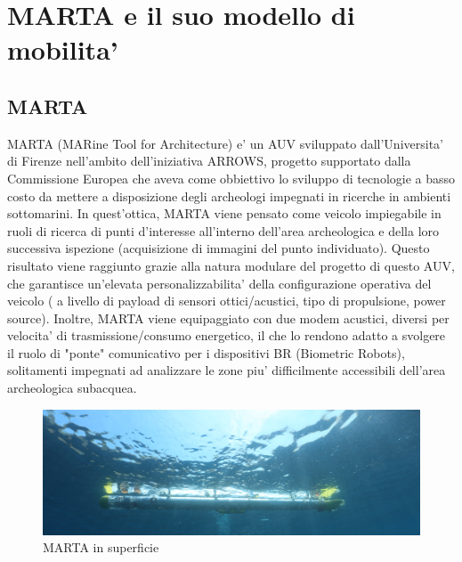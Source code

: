 \chapter{MARTA e il suo modello di mobilita'}

\section{MARTA}

MARTA (MARine Tool for Architecture) e' un AUV sviluppato dall'Universita' di Firenze nell'ambito dell'iniziativa ARROWS, progetto supportato dalla Commissione Europea che aveva come obbiettivo lo sviluppo di tecnologie a basso costo da mettere a disposizione degli archeologi impegnati in ricerche in ambienti sottomarini. In quest'ottica, MARTA viene pensato come veicolo impiegabile in ruoli di ricerca di punti d'interesse all'interno dell'area archeologica e della loro successiva ispezione (acquisizione di immagini del punto individuato). \newline
Questo risultato viene raggiunto grazie alla natura modulare del progetto di questo AUV, che garantisce un'elevata personalizzabilita' della configurazione operativa del veicolo ( a livello di payload di sensori ottici/acustici, tipo di propulsione, power source). \newline
Inoltre, MARTA viene equipaggiato con due modem acustici, diversi per velocita' di trasmissione/consumo energetico, il che lo rendono adatto a svolgere il ruolo di "ponte" comunicativo per i dispositivi BR (Biometric Robots), solitamenti impegnati ad analizzare le zone piu' difficilmente accessibili dell'area archeologica subacquea.

\begin{figure}[H]
	\includegraphics[width=\linewidth]{MARTA.png}
	\caption{MARTA in superficie}
	\label{fig:MARTA}
	\centering
\end{figure}

